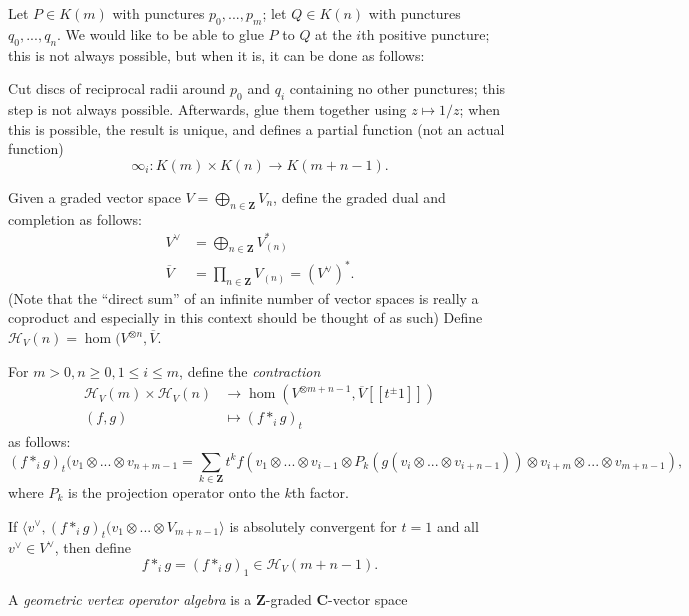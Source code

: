 \documentclass{article}
\newcommand{\CC}{\mathbold{C}}
\newcommand{\ZZ}{\mathbold{Z}}
\newcommand{\Hh}{\mathcal{H}}
\begin{document}
Let $P \in K(m)$ with punctures $p_0,...,p_m$; let $Q \in K(n)$ with punctures $q_0,...,q_n$.  We would like to be able to glue $P$ to $Q$ at the $i$th positive puncture; this is not always possible, but when it is, it can be done as follows:

Cut discs of reciprocal radii around $p_0$ and $q_i$ containing no other punctures; this step is not always possible.  Afterwards, glue them together using $z \mapsto 1/z$; when this is possible, the result is unique, and defines a partial function (not an actual function)
\[\infty_i : K(m) \times K(n) \rightarrow K(m+n-1). \]

Given a graded vector space $V=\bigoplus_{n \in \ZZ}V_n$, define the graded dual and completion as follows:
\begin{align}
  V^\vee&=\bigoplus_{n \in \ZZ}V^*_{(n)}\\
  \overline{V}&=\prod_{n \in \ZZ}V_{(n)}=(V^\vee)^*.
\end{align}
(Note that the ``direct sum'' of an infinite number of vector spaces is really a coproduct and especially in this context should be thought of as such)
Define $\Hh_V(n)=\hom(V^{\otimes n},\overline{V}$.

For $m>0, n \ge 0, 1 \le i \le m$, define the \textit{contraction}
\begin{align}
  \Hh_V(m) \times \Hh_V(n) &\rightarrow \hom(V^{\otimes m+n-1},\overline{V}[[t^\pm 1]])\\
  (f,g) &\mapsto (f *_i g)_t
\end{align}
as follows:
\[(f*_ig)_t(v_1 \otimes ... \otimes v_{n+m-1} = \sum_{k \in \ZZ}t^kf(v_1 \otimes ... \otimes v_{i-1} \otimes P_k(g(v_i \otimes ... \otimes v_{i+n-1})) \otimes v_{i+m} \otimes ... \otimes v_{m+n-1}), \]
where $P_k$ is the projection operator onto the $k$th factor.

If $\langle v^\vee,(f*_ig)_t(v_1 \otimes ... \otimes V_{m+n-1}\rangle$ is absolutely convergent for $t=1$ and all $v^\vee \in V^\vee$, then define
\[f*_ig=(f*_ig)_1 \in \Hh_V(m+n-1). \]

A \textit{geometric vertex operator algebra} is a $\ZZ$-graded $\CC$-vector space
\end{document}
